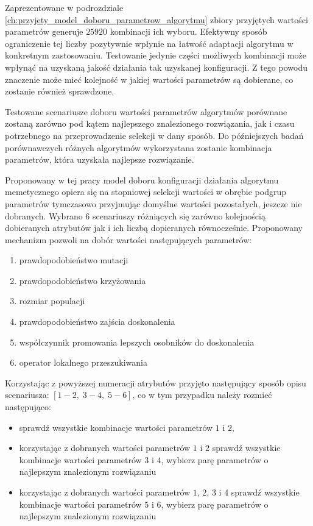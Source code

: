 \par
Zaprezentowane w podrozdziale \ref{ch:przyjety_model_doboru_parametrow_algorytmu} zbiory przyjętych wartości parametrów generuje $25920$ kombinacji ich wyboru. Efektywny sposób ograniczenie tej liczby pozytywnie wpłynie na łatwość adaptacji algorytmu w konkretnym zastosowaniu. Testowanie jedynie części możliwych kombinacji może wpłynąć na uzyskaną jakość działania tak uzyskanej konfiguracji. Z tego powodu znaczenie może mieć kolejność w jakiej wartości parametrów są dobierane, co zostanie również sprawdzone. 
\par
Testowane scenariusze doboru wartości parametrów algorytmów porównane zostaną zarówno pod kątem najlepszego znalezionego rozwiązania, jak i czasu potrzebnego na przeprowadzenie selekcji w dany sposób. Do późniejszych badań porównawczych różnych algorytmów wykorzystana zostanie kombinacja parametrów, która uzyskała najlepsze rozwiązanie. 
\par
Proponowany w tej pracy model doboru konfiguracji działania algorytmu memetycznego opiera się na stopniowej selekcji wartości w obrębie podgrup parametrów tymczasowo przyjmując domyślne wartości pozostałych, jeszcze nie dobranych. Wybrano 6 scenariuszy różniących się zarówno kolejnością dobieranych atrybutów jak i ich liczbą dopieranych równocześnie. Proponowany mechanizm pozwoli na dobór wartości następujących parametrów:
\begin{enumerate}
\item prawdopodobieństwo mutacji
\item prawdopodobieństwo krzyżowania
\item rozmiar populacji
\item prawdopodobieństwo zajścia doskonalenia
\item współczynnik promowania lepszych osobników do doskonalenia
\item operator lokalnego przeszukiwania
\end{enumerate}
Korzystając z powyższej numeracji atrybutów przyjęto następujący sposób opisu scenariusza: $[1-2,\; 3-4,\; 5-6]$, co w tym przypadku należy rozmieć następująco:
\begin{itemize}
\item sprawdź wszystkie kombinacje wartości parametrów $1$ i $2$, 
\item korzystając z dobranych wartości parametrów $1$ i $2$ sprawdź wszystkie kombinacje wartości parametrów $3$ i $4$, wybierz parę parametrów o najlepszym znalezionym rozwiązaniu
\item korzystając z dobranych wartości parametrów $1$, $2$, $3$ i $4$ sprawdź wszystkie kombinacje wartości parametrów $5$ i $6$, wybierz parę parametrów o najlepszym znalezionym rozwiązaniu
\end{itemize}
